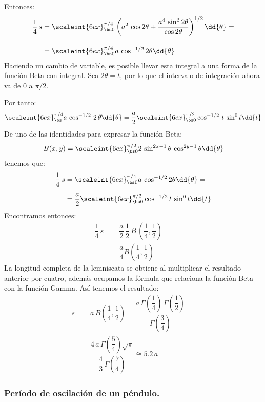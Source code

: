 Entonces:
\begin{align*}
\dfrac{1}{4} \, s &= \scaleint{6ex}_{\bs 0}^{\pi/4} \left( a^{2} \, \cos 2 \theta + \dfrac{a^{4} \, \sin^{2} 2 \theta}{\cos 2 \theta} \right)^{1/2} \dd{\theta} = \\[1em]
&= \scaleint{6ex}_{\bs 0}^{\pi/4} a \, \cos^{-1/2} 2 \theta \dd{\theta}
\end{align*}
Haciendo un cambio de variable, es posible llevar esta integral a una forma de la función Beta con integral. Sea $2 \theta = t$, por lo que el intervalo de integración ahora va de $0$ a $\pi/2$.
\par
Por tanto:
\begin{align*}
\scaleint{6ex}_{\bs }^{\pi/4} a \, \cos^{-1/2} \, 2 \, \theta \dd{\theta} = \dfrac{a}{2} \scaleint{6ex}_{\bs 0}^{\pi/2} \cos^{-1/2} \, t \, \sin^{0} t \dd{t}
\end{align*}
De uno de las identidades para expresar la función Beta:
\begin{align*}
B(x, y) = \scaleint{6ex}_{\bs 0}^{\pi/2} 2 \, \sin^{2x-1} \theta \, \cos^{2y-1} \theta \dd{\theta}
\end{align*}
tenemos que:
\begin{align*}
\dfrac{1}{4} \, s &= \scaleint{6ex}_{\bs 0}^{\pi/4} a \, \cos^{-1/2} 2 \theta \dd{\theta} =  \\[0.5em]
&= \dfrac{a}{2} \scaleint{6ex}_{\bs 0}^{\pi/2} \cos^{-1/2} t \, \sin^{0} t \dd{t}
\end{align*}
Encontramos entonces:
\begin{align*}
\dfrac{1}{4} \, s &= \dfrac{a}{2} \, \dfrac{1}{2} \, B \, \left(\dfrac{1}{4}, \dfrac{1}{2} \right) = \\[1em]
&= \dfrac{a}{4} B\left(\dfrac{1}{4}, \dfrac{1}{2} \right)
\end{align*}
La longitud completa de la lemniscata se obtiene al multiplicar el resultado anterior por cuatro, además ocupamos la fórmula que relaciona la función Beta con la función Gamma. Así tenemos el resultado:
\begin{align*}
s &= a \, B\left(\dfrac{1}{4}, \dfrac{1}{2} \right) = \dfrac{a \, \Gamma \left( \dfrac{1}{4} \right) \, \Gamma \left( \dfrac{1}{2} \right) }{\Gamma \left( \dfrac{3}{4} \right)} = \\
&= \dfrac{4 \, a \, \Gamma \left( \dfrac{5}{4} \right) \sqrt{\pi}}{\dfrac{4}{3} \, \Gamma \left( \dfrac{7}{4} \right)} \cong 5.2 \, a
\end{align*}

\subsubsection{Período de oscilación de un péndulo.}

